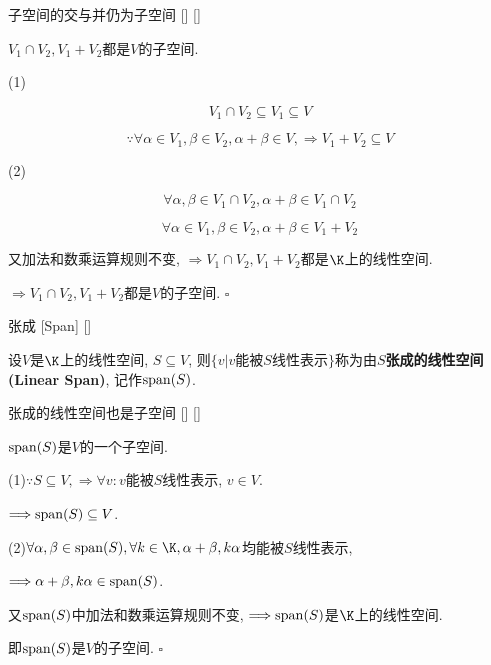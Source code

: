 \documentclass[UTF8]{ctexart}
\begin{document}
		\begin{ppt}
			[]
			{子空间的交与并仍为子空间}
			[]
			[]

			$V_{1}\cap V_{2}, V_{1}+V_{2}$都是$V$的子空间. 
		\end{ppt}
  
		\begin{prf}
		
			(1)
			
			\[V_{1}\cap V_{2}\subseteq V_{1}\subseteq V\]
			
			\[\because \forall \alpha \in V_{1},\beta\in V_{2}, \alpha+\beta\in V, \Longrightarrow V_{1}+V_{2}\subseteq V\]
			
			(2)
			
			\[\forall \alpha,\beta \in V_{1}\cap V_{2}, \alpha+\beta\in V_{1}\cap V_{2}\]
			
			\[\forall \alpha \in V_{1}, \beta\in V_{2}, \alpha+\beta\in V_{1}+V_{2}\]
			
			又加法和数乘运算规则不变, $\Longrightarrow V_{1}\cap V_{2}, V_{1}+V_{2}$都是$\K$上的线性空间. 
			
			$\Longrightarrow V_{1}\cap V_{2}, V_{1}+V_{2}$都是$V$的子空间. $\square$
		\end{prf}
  
		\begin{dfn}
			[]
			{张成}
			[Span]
			[]

			设$V$是$\K$上的线性空间, $S \subseteq V$, 则$\{v|v$能被$S$线性表示$\}$称为由$S$\textbf{张成的线性空间(Linear Span)}, 记作${\rm span}(S)$. 
		\end{dfn}
		
		\begin{ppt}
			[]
			{张成的线性空间也是子空间}
			[]
			[]

			${\rm span}(S)$是$V$的一个子空间. 
		\end{ppt}
  
	    \begin{prf}		
			
			(1)$\because S\subseteq V, \Longrightarrow\forall v: v$能被$S$线性表示, $v\in V$. 
			
			$\Longrightarrow {\rm span}(S)\subseteq V$. 
			
			(2)$\forall \alpha, \beta\in {\rm span}(S), \forall k\in\K, \alpha+\beta,k\alpha$均能被$S$线性表示, 
			
			$\Longrightarrow \alpha+\beta, k\alpha\in {\rm span}(S)$. 
			
			又${\rm span}(S)$中加法和数乘运算规则不变, $\Longrightarrow {\rm span}(S)$是$\K$上的线性空间. 
			
			即${\rm span}(S)$是$V$的子空间. $\square$
        \end{prf}
		
\end{document}
